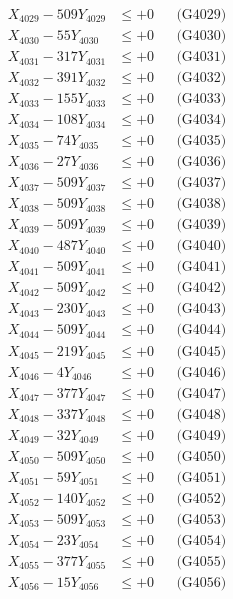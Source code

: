 \documentclass[a4paper,10pt]{article}
\begin{document}
{\begin{align}
X_{4029} - 509Y_{4029} &\leq +0 && \text{(G4029)} \\
X_{4030} - 55Y_{4030} &\leq +0 && \text{(G4030)} \\
\allowbreak
X_{4031} - 317Y_{4031} &\leq +0 && \text{(G4031)} \\
X_{4032} - 391Y_{4032} &\leq +0 && \text{(G4032)} \\
X_{4033} - 155Y_{4033} &\leq +0 && \text{(G4033)} \\
X_{4034} - 108Y_{4034} &\leq +0 && \text{(G4034)} \\
X_{4035} - 74Y_{4035} &\leq +0 && \text{(G4035)} \\
X_{4036} - 27Y_{4036} &\leq +0 && \text{(G4036)} \\
X_{4037} - 509Y_{4037} &\leq +0 && \text{(G4037)} \\
X_{4038} - 509Y_{4038} &\leq +0 && \text{(G4038)} \\
X_{4039} - 509Y_{4039} &\leq +0 && \text{(G4039)} \\
X_{4040} - 487Y_{4040} &\leq +0 && \text{(G4040)} \\
\allowbreak
X_{4041} - 509Y_{4041} &\leq +0 && \text{(G4041)} \\
X_{4042} - 509Y_{4042} &\leq +0 && \text{(G4042)} \\
X_{4043} - 230Y_{4043} &\leq +0 && \text{(G4043)} \\
X_{4044} - 509Y_{4044} &\leq +0 && \text{(G4044)} \\
X_{4045} - 219Y_{4045} &\leq +0 && \text{(G4045)} \\
X_{4046} - 4Y_{4046} &\leq +0 && \text{(G4046)} \\
X_{4047} - 377Y_{4047} &\leq +0 && \text{(G4047)} \\
X_{4048} - 337Y_{4048} &\leq +0 && \text{(G4048)} \\
X_{4049} - 32Y_{4049} &\leq +0 && \text{(G4049)} \\
X_{4050} - 509Y_{4050} &\leq +0 && \text{(G4050)} \\
\allowbreak
X_{4051} - 59Y_{4051} &\leq +0 && \text{(G4051)} \\
X_{4052} - 140Y_{4052} &\leq +0 && \text{(G4052)} \\
X_{4053} - 509Y_{4053} &\leq +0 && \text{(G4053)} \\
X_{4054} - 23Y_{4054} &\leq +0 && \text{(G4054)} \\
X_{4055} - 377Y_{4055} &\leq +0 && \text{(G4055)} \\
X_{4056} - 15Y_{4056} &\leq +0 && \text{(G4056)} \\

\end{align}}
\end{document}
